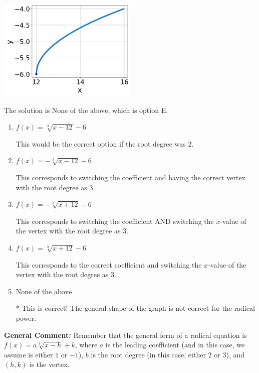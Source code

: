 \documentclass{extbook}[14pt]
\begin{document}
\begin{enumerate}
{\begin{center}
    \includegraphics[width=0.5\textwidth]{../Figures/radicalGraphToEquationCopyA.png}
\end{center}




The solution is \( \text{None of the above} \), which is option E.\begin{enumerate}[label=\Alph*.]
\item \( f(x) = \sqrt[3]{x - 12} - 6 \)

This would be the correct option if the root degree was $2$.
\item \( f(x) = - \sqrt[3]{x - 12} - 6 \)

This corresponds to switching the coefficient and having the correct vertex with the root degree as $3$.
\item \( f(x) = - \sqrt[3]{x + 12} - 6 \)

This corresponds to switching the coefficient AND switching the $x$-value of the vertex with the root degree as $3$.
\item \( f(x) = \sqrt[3]{x + 12} - 6 \)

This corresponds to the correct coefficient and switching the $x$-value of the vertex with the root degree as $3$.
\item \( \text{None of the above} \)

* This is correct! The general shape of the graph is not correct for the radical power.
\end{enumerate}

\textbf{General Comment:} Remember that the general form of a radical equation is $ f(x) = a \sqrt[b]{x - h} + k$, where $a$ is the leading coefficient (and in this case, we assume is either $1$ or $-1$), $b$ is the root degree (in this case, either $2$ or $3$), and $(h, k)$ is the vertex.
}
\end{enumerate}
\end{document}
